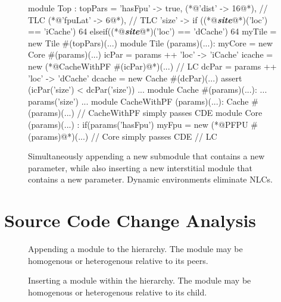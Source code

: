 \begin{figure}
\centering
\begin{phdl}
module Top :
  topPars = {'hasFpu' -> true,
             (*@\textcolor[rgb]{1,0,0}{'dist' -> 16}@*),                                   // TLC
             (*@\textcolor[rgb]{1,0,0}{'fpuLat' -> 6}@*),                                  // TLC
             'size' -> if    ((*@\textcolor[rgb]{1,0.5,0}{\textbf{\textit{site}}}@*)('loc') == 'iCache') 64 
                       elseif((*@\textcolor[rgb]{1,0.5,0}{\textbf{\textit{site}}}@*)('loc') == 'dCache') 64}           
  myTile = new Tile #(topPars)(...)
module Tile (params)(...):
  myCore = new Core #(params)(...)
  icPar = params ++ {'loc' -> 'iCache'}                                                           
  icache = new (*@\textcolor[rgb]{1,0,0}{CacheWithPF \#(icPar)}@*)(...)                           // LC
  dcPar = params ++ {'loc' -> 'dCache'}
  dcache = new Cache #(dcPar)(...)
  assert (icPar('size') < dcPar('size')) ...
module Cache #(params)(...):
  ... params('size') ...
module CacheWithPF (params)(...):
  Cache #(params)(...)        // CacheWithPF simply passes CDE
module Core (params)(...) :
  if(params('hasFpu') myFpu = new (*@\textcolor[rgb]{1,0,0}{PFPU \#(params)}@*)(...) // Core simply passes CDE  // LC
\end{phdl} 
\caption{Simultaneously appending a new submodule that contains a new parameter, while also inserting
a new interstitial module that contains a new parameter. Dynamic environments eliminate NLCs.}
\label{fig:cde-delta}
\end{figure}

\section{Source Code Change Analysis}
\label{sec:scca}

\begin{figure}
\centering
{}
\caption{Appending a module to the hierarchy.
The module may be homogenous or heterogenous relative to its peers.}
\label{fig:hc}
\end{figure}

\begin{figure}
\centering
{}
\caption{Inserting a module within the hierarchy.
The module may be homogenous or heterogenous relative to its child.}
\label{fig:vc}
\end{figure}

